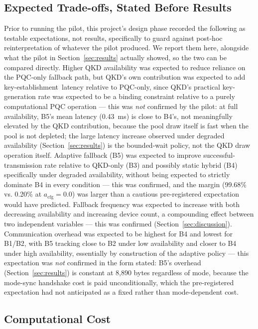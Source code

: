\documentclass[journal]{IEEEtran}
\newcommand{\keyest}{key-establishment}
\newcommand{\acfg}{\ensuremath{a_{\text{cfg}}}}
\begin{document}
\subsection{Expected Trade-offs, Stated Before Results}

Prior to running the pilot, this project's design phase recorded the following as testable expectations, not results, specifically to guard against post-hoc reinterpretation of whatever the pilot produced. We report them here, alongside what the pilot in Section~\ref{sec:results} actually showed, so the two can be compared directly. Higher QKD availability was expected to reduce reliance on the PQC-only fallback path, but QKD's own contribution was expected to add \keyest\ latency relative to PQC-only, since QKD's practical key-generation rate was expected to be a binding constraint relative to a purely computational PQC operation --- this was \emph{not} confirmed by the pilot: at full availability, B5's mean latency (\qty{0.43}{ms}) is close to B4's, not meaningfully elevated by the QKD contribution, because the pool draw itself is fast when the pool is not depleted; the large latency increase observed under degraded availability (Section~\ref{sec:results}) is the bounded-wait policy, not the QKD draw operation itself. Adaptive fallback (B5) was expected to improve successful-transmission rate relative to QKD-only (B3) and possibly static hybrid (B4) specifically under degraded availability, without being expected to strictly dominate B4 in every condition --- this was confirmed, and the margin (99.68\% vs. 0.20\% at $\acfg=0.0$) was larger than a cautious pre-registered expectation would have predicted. Fallback frequency was expected to increase with both decreasing availability and increasing device count, a compounding effect between two independent variables --- this was confirmed (Section~\ref{sec:discussion}). Communication overhead was expected to be highest for B4 and lowest for B1/B2, with B5 tracking close to B2 under low availability and closer to B4 under high availability, essentially by construction of the adaptive policy --- this expectation was \emph{not} confirmed in the form stated: B5's overhead (Section~\ref{sec:results}) is constant at 8{,}890 bytes regardless of mode, because the mode-sync handshake cost is paid unconditionally, which the pre-registered expectation had not anticipated as a fixed rather than mode-dependent cost.

\subsection{Computational Cost}
\end{document}

